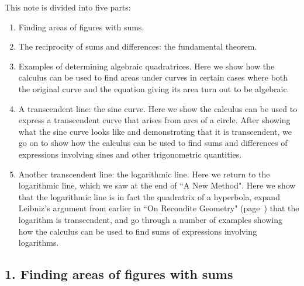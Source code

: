 \documentclass[twoside,openright]{article}
\begin{document}
\smallskip

This note is divided into five parts:
\vspace{-0.5em}
\begin{enumerate}
\itemsep0em
\item Finding areas of figures with sums.
\item The reciprocity of sums and differences: the fundamental
  theorem.
\item Examples of determining algebraic quadratrices.  Here we show
  how the calculus can be used to find areas under curves in certain
  cases where both the original curve and the equation giving its area
  turn out to be algebraic.
\item A transcendent line: the sine curve.  Here we show the calculus
  can be used to express a transcendent curve that arises from arcs of
  a circle.  After showing what the sine curve looks like and
  demonstrating that it is transcendent, we go on to show how the
  calculus can be used to find sums and differences of expressions
  involving sines and other trigonometric quantities.
\item Another transcendent line: the logarithmic line.  Here we return
  to the logarithmic line, which we saw at the end of ``A New Method".
  Here we show that the logarithmic line is in fact the quadratrix of
  a hyperbola, expand Leibniz's argument from earlier in ``On
  Recondite Geometry" (page~\pageref{logtrans}) that the logarithm is
  transcendent, and go through a number of examples showing how the
  calculus can be used to find sums of expressions involving
  logarithms.
\end{enumerate}

\subsection*{1. Finding areas of figures with sums}
\end{document}
